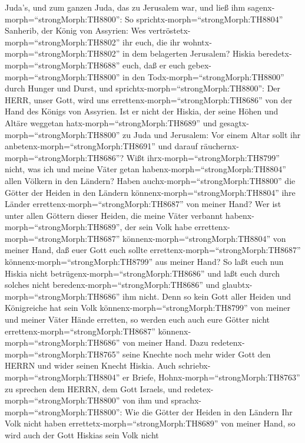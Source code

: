 Juda's, und zum ganzen Juda, das zu Jerusalem war, und ließ ihm
sagenx-morph=``strongMorph:TH8800'':  So
sprichtx-morph=``strongMorph:TH8804'' Sanherib, der König von Assyrien:
Wes vertröstetx-morph=``strongMorph:TH8802'' ihr euch, die ihr
wohntx-morph=``strongMorph:TH8802'' in dem belagerten Jerusalem?
 Hiskia beredetx-morph=``strongMorph:TH8688'' euch, daß er
euch gebex-morph=``strongMorph:TH8800'' in den
Todx-morph=``strongMorph:TH8800'' durch Hunger und Durst, und
sprichtx-morph=``strongMorph:TH8800'': Der HERR, unser Gott, wird uns
errettenx-morph=``strongMorph:TH8686'' von der Hand des Königs von
Assyrien.  Ist er nicht der Hiskia, der seine Höhen und
Altäre weggetan hatx-morph=``strongMorph:TH8689'' und
gesagtx-morph=``strongMorph:TH8800'' zu Juda und Jerusalem: Vor einem
Altar sollt ihr anbetenx-morph=``strongMorph:TH8691'' und darauf
räuchernx-morph=``strongMorph:TH8686''?  Wißt
ihrx-morph=``strongMorph:TH8799'' nicht, was ich und meine Väter getan
habenx-morph=``strongMorph:TH8804'' allen Völkern in den Ländern? Haben
auchx-morph=``strongMorph:TH8800'' die Götter der Heiden in den Ländern
könnenx-morph=``strongMorph:TH8804'' ihre Länder
errettenx-morph=``strongMorph:TH8687'' von meiner Hand? 
Wer ist unter allen Göttern dieser Heiden, die meine Väter verbannt
habenx-morph=``strongMorph:TH8689'', der sein Volk habe
errettenx-morph=``strongMorph:TH8687''
könnenx-morph=``strongMorph:TH8804'' von meiner Hand, daß euer Gott euch
sollte errettenx-morph=``strongMorph:TH8687''
könnenx-morph=``strongMorph:TH8799'' aus meiner Hand?  So
laßt euch nun Hiskia nicht betrügenx-morph=``strongMorph:TH8686'' und
laßt euch durch solches nicht beredenx-morph=``strongMorph:TH8686'' und
glaubtx-morph=``strongMorph:TH8686'' ihm nicht. Denn so kein Gott aller
Heiden und Königreiche hat sein Volk
könnenx-morph=``strongMorph:TH8799'' von meiner und meiner Väter Hände
erretten, so werden euch auch eure Götter nicht
errettenx-morph=``strongMorph:TH8687''
könnenx-morph=``strongMorph:TH8686'' von meiner Hand.  Dazu
redetenx-morph=``strongMorph:TH8765'' seine Knechte noch mehr wider Gott
den HERRN und wider seinen Knecht Hiskia.  Auch
schriebx-morph=``strongMorph:TH8804'' er Briefe,
Hohnx-morph=``strongMorph:TH8763'' zu sprechen dem HERRN, dem Gott
Israels, und redetex-morph=``strongMorph:TH8800'' von ihm und
sprachx-morph=``strongMorph:TH8800'': Wie die Götter der Heiden in den
Ländern Ihr Volk nicht haben errettetx-morph=``strongMorph:TH8689'' von
meiner Hand, so wird auch der Gott Hiskias sein Volk nicht
